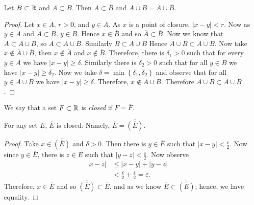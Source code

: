 

\begin{proposition}[]
	Let $B \subset \mathbb{R}$ and $A \subset B$.
	Then $\overline A \subset \overline B$ and 
	$\overline{A \cup B} = \overline A \cup \overline B$.
\end{proposition}

\begin{proof}
	Let $x \in \overline A$, $r > 0$, and $y \in A$.
	As $x$ is a point of closure, $\left\lvert x-y \right\rvert < r$.
	Now as $y \in A$ and $A \subset B$, $y \in B$.
	Hence $x \in \overline B$ and so $\overline A \subset \overline B$.
	Now we know that $A \subset A \cup B$, so 
	$\overline A \subset \overline{A \cup B}$.
	Similarly $\overline B \subset \overline{A \cup B}$
	Hence $\overline A \cup \overline B \subset \overline{A \cup B}$.
	Now take $x \not\in \overline A \cup \overline B$, then 
	$x \not\in\overline A$ and $x \not\in\overline B$.
	Therefore, there is $\delta_1 > 0$ such that for every $y \in A$ we have
	$\left\lvert x - y \right\rvert \geq \delta$.
	Similarly there is $\delta_2 > 0$ such that for all $y \in B$ we have
	$\left\lvert x - y \right\rvert \geq \delta_2$.
	Now we take $\delta = \min\left\{ \delta_1, \delta_2 \right\}$ and observe
	that for all $y \in A \cup B$ we have
	$\left\lvert x - y \right\rvert \geq \delta$.
	Therefore, $x \not\in \overline{A \cup B}$.
	Therefore $\overline{A \cup B} \subset \overline A \cup \overline B$.
\end{proof}

\begin{definition}
	We say that a set $F \subset \mathbb{R}$ is \emph{closed} if $F = \overline F$.
\end{definition}

\begin{proposition}[]
	For any set $E$, $\overline E$ is closed.
	Namely, $\overline E = \overline{\left(\overline E\right)}$.
\end{proposition}

\begin{proof}
	Take $x \in \overline{\left( \overline E \right)}$ and $\delta > 0$.
	Then there is $y \in \overline E$ such that 
	$\left\lvert x - y \right\rvert < \frac{\varepsilon}{2}$.
	Now since $y \in \overline E$, there is $z \in E$ such that
	$\left\lvert y - z \right\rvert < \frac{\varepsilon}{2}$.
	Now observe
	\begin{align*}
		\left\lvert x - z \right\rvert
		&\leq \left\lvert x - y \right\rvert + \left\lvert y - z \right\rvert \\
		&< \frac{\varepsilon}{2} + \frac{\varepsilon}{2} = \varepsilon.
	\end{align*}
	Therefore, $x \in \overline E$ and so 
	$\overline{\left( \overline E \right)} \subset \overline E$, and as we know
	$\overline E \subset \overline{\left( \overline E \right)}$; hence, we have
	equality.
\end{proof}

